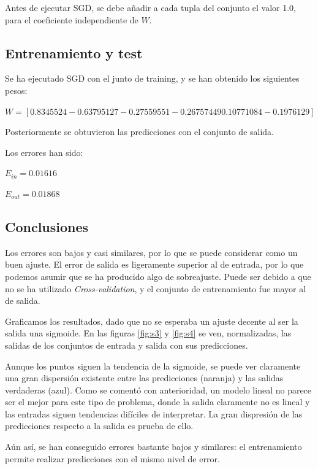\documentclass[12pt,spanish]{article} %
\begin{document}
Antes de ejecutar SGD, se debe añadir a cada tupla del conjunto el valor 1.0, para el coeficiente independiente de $W$.

\subsection{Entrenamiento y test}

Se ha ejecutado SGD con el junto de training, y se han obtenido los siguientes pesos:

$W = [ 0.8345524  -0.63795127 -0.27559551 -0.26757449  0.10771084 -0.1976129 ]$

Posteriormente se obtuvieron las predicciones con el conjunto de salida.

Los errores han sido:

$E_{in} = 0.01616$

$E_{out} = 0.01868$

\subsection{Conclusiones}

Los errores son bajos y casi similares, por lo que se puede considerar como un buen ajuste. El error de salida es ligeramente superior al de entrada, por lo que podemos asumir que se ha producido algo de sobreajuste. Puede ser debido a que no se ha utilizado \textit{Cross-validation}, y el conjunto de entrenamiento fue mayor al de salida.

Graficamos los resultados, dado que no se esperaba un ajuste decente al ser la salida una sigmoide. En las figuras \ref{fig:s3} y \ref{fig:s4} se ven, normalizadas, las salidas de los conjuntos de entrada y salida con sus predicciones.

Aunque los puntos siguen la tendencia de la sigmoide, se puede ver claramente una gran dispersión existente entre las predicciones (naranja) y las salidas verdaderas (azul). Como se comentó con anterioridad, un modelo lineal no parece ser el mejor para este tipo de problema, donde la salida claramente no es lineal y las entradas siguen tendencias difíciles de interpretar. La gran dispresión de las predicciones respecto a la salida es prueba de ello.

Aún así, se han conseguido errores bastante bajos y similares: el entrenamiento permite realizar predicciones con el mismo nivel de error.
\end{document}
